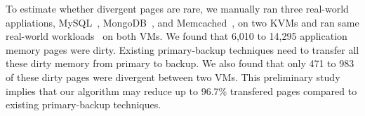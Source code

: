 To estimate whether divergent pages are rare, we manually ran three real-world 
appliations, MySQL~\cite{mysql}, MongoDB~\cite{mongodb}, and 
Memcached~\cite{memcached}, on two KVMs and ran same real-world 
workloads~\cite{sysbench} on both VMs. We found that 6,010 to 14,295 application 
memory pages were dirty. Existing primary-backup techniques need to transfer all 
these dirty memory from primary to backup. We also found that only 471 to 983 of 
these dirty pages were divergent between two VMs. This preliminary study implies 
that our algorithm may reduce up to 96.7\% transfered pages compared to 
existing primary-backup techniques.





